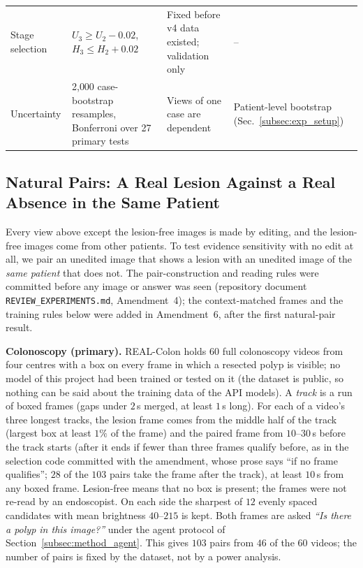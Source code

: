 \documentclass[5p,times,twocolumn,authoryear]{elsarticle}
\begin{document}
\begin{table}[!t]
\begin{center}
\begin{adjustbox}{max width=\linewidth}
\begin{tabular}{L{2.6cm}L{3.4cm}L{4.6cm}L{3.6cm}}
Stage selection & $U_3 \ge U_2 - 0.02$, $H_3 \le H_2 + 0.02$ & Fixed before v4 data existed; validation only & -- \\
Uncertainty & 2{,}000 case-bootstrap resamples, Bonferroni over 27 primary tests & Views of one case are dependent & Patient-level bootstrap (Sec.~\ref{subsec:exp_setup}) \\
\bottomrule
\end{tabular}
\end{adjustbox}
\end{center}
\end{table}

\subsection{Natural Pairs: A Real Lesion Against a Real Absence in the Same Patient}
\label{subsec:method_natural}
Every view above except the lesion-free images is made by editing, and the lesion-free images come from other patients. To test evidence sensitivity with no edit at all, we pair an unedited image that shows a lesion with an unedited image of the \emph{same patient} that does not. The pair-construction and reading rules were committed before any image or answer was seen (repository document \texttt{REVIEW\_EXPERIMENTS.md}, Amendment~4); the context-matched frames and the training rules below were added in Amendment~6, after the first natural-pair result.

\textbf{Colonoscopy (primary).} REAL-Colon \citep{biffi2024realcolon} holds $60$ full colonoscopy videos from four centres with a box on every frame in which a resected polyp is visible; no model of this project had been trained or tested on it (the dataset is public, so nothing can be said about the training data of the API models). A \emph{track} is a run of boxed frames (gaps under $2$\,s merged, at least $1$\,s long). For each of a video's three longest tracks, the lesion frame comes from the middle half of the track (largest box at least $1\%$ of the frame) and the paired frame from $10$--$30$\,s before the track starts (after it ends if fewer than three frames qualify before, as in the selection code committed with the amendment, whose prose says ``if no frame qualifies''; $28$ of the $103$ pairs take the frame after the track), at least $10$\,s from any boxed frame. Lesion-free means that no box is present; the frames were not re-read by an endoscopist. On each side the sharpest of $12$ evenly spaced candidates with mean brightness $40$--$215$ is kept. Both frames are asked \emph{``Is there a polyp in this image?''} under the agent protocol of Section~\ref{subsec:method_agent}. This gives $103$ pairs from $46$ of the $60$ videos; the number of pairs is fixed by the dataset, not by a power analysis.
\end{document}

